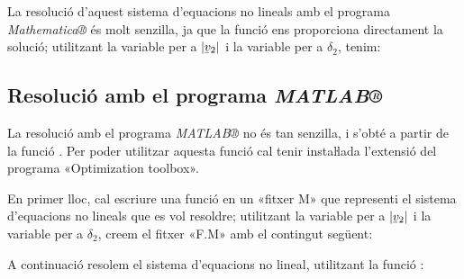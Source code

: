 La resolució d'aquest sistema d'equacions no lineals amb el programa \emph{Mathematica®} és molt senzilla, ja que la funció  ens proporciona directament la solució; utilitzant la variable  per a $|\cmplx{v}_2|$ i la variable  per a $\delta_2$, tenim:

\hspace{1cm}

\hspace{1cm}

\subsection{Resolució amb el programa \emph{MATLAB®}}

La resolució amb el programa \emph{MATLAB®} no és tan senzilla, i s'obté a partir de la funció  . Per poder utilitzar aquesta funció cal tenir instaŀlada l'extensió del programa «Optimization toolbox».

En primer lloc, cal escriure una funció en un «fitxer M» que representi el sistema d'equacions no lineals que es vol resoldre; utilitzant la variable  per a $|\cmplx{v}_2|$ i la variable  per a $\delta_2$, creem el fitxer «F.M» amb el contingut següent:

\hspace{1cm}

\hspace{1cm}

\hspace{1cm}

A continuació resolem el sistema d'equacions no lineal, utilitzant la funció :

\hspace{1cm}

